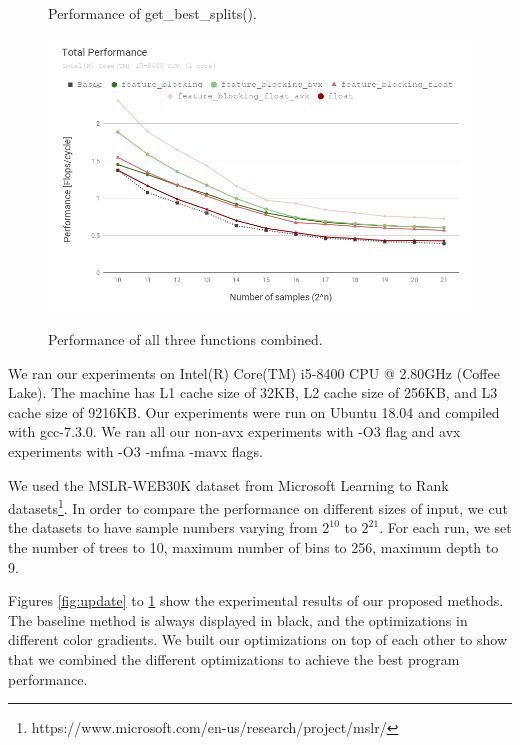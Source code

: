 \begin{figure}[t!]
\begin{minipage}{.45\textwidth}
      \caption{Performance of get\_best\_splits().}
      \label{fig:gbs}
      \includegraphics[width=1.0\textwidth]{fig/total.png}
      \caption{Performance of all three functions combined.}
      \label{fig:all}
  \end{minipage}
\end{figure}
 
 We ran our experiments on Intel(R) Core(TM) i5-8400 CPU @ 2.80GHz (Coffee Lake). The machine has L1 cache size of 32KB, L2 cache size of 256KB, and L3 cache size of 9216KB. Our experiments were run on Ubuntu 18.04 and compiled with gcc-7.3.0. We ran all our non-avx experiments with -O3 flag and avx experiments with -O3 -mfma -mavx flags.

We used the MSLR-WEB30K dataset from Microsoft Learning to Rank datasets\footnote{https://www.microsoft.com/en-us/research/project/mslr/}.
In order to compare the performance on different sizes of input, we cut the datasets to have sample numbers varying from $2^{10}$ to $2^{21}$. For each run, we set the number of trees to 10, maximum number of bins to 256, maximum depth to 9.


Figures \ref{fig:update} to \ref{fig:all} show the experimental results of our proposed methods. The baseline method is always displayed in black, and the optimizations in different color gradients. We built our optimizations on top of each other to show that we combined the different optimizations to achieve the best program performance.

